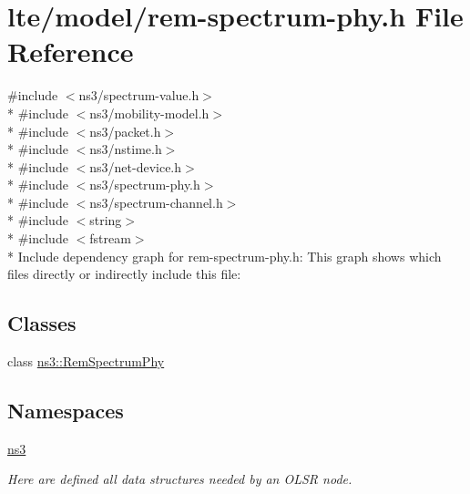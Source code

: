 \hypertarget{lte_2model_2rem-spectrum-phy_8h}{}\section{lte/model/rem-\/spectrum-\/phy.h File Reference}
\label{lte_2model_2rem-spectrum-phy_8h}
{\ttfamily \#include $<$ns3/spectrum-\/value.\+h$>$}\\*
{\ttfamily \#include $<$ns3/mobility-\/model.\+h$>$}\\*
{\ttfamily \#include $<$ns3/packet.\+h$>$}\\*
{\ttfamily \#include $<$ns3/nstime.\+h$>$}\\*
{\ttfamily \#include $<$ns3/net-\/device.\+h$>$}\\*
{\ttfamily \#include $<$ns3/spectrum-\/phy.\+h$>$}\\*
{\ttfamily \#include $<$ns3/spectrum-\/channel.\+h$>$}\\*
{\ttfamily \#include $<$string$>$}\\*
{\ttfamily \#include $<$fstream$>$}\\*
Include dependency graph for rem-\/spectrum-\/phy.h\+:
This graph shows which files directly or indirectly include this file\+:
\subsection*{Classes}
\begin{DoxyCompactItemize}
\item 
class \hyperlink{classns3_1_1RemSpectrumPhy}{ns3\+::\+Rem\+Spectrum\+Phy}
\end{DoxyCompactItemize}
\subsection*{Namespaces}
\begin{DoxyCompactItemize}
\item 
 \hyperlink{namespacens3}{ns3}
\begin{DoxyCompactList}\small\item\em Here are defined all data structures needed by an O\+L\+SR node. \end{DoxyCompactList}\end{DoxyCompactItemize}
